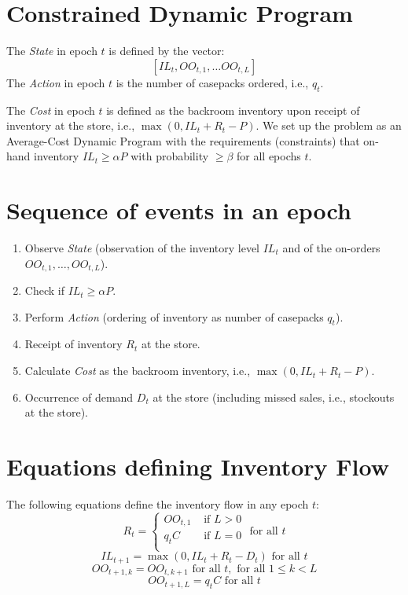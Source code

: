 \documentclass[12pt]{amsart}
\begin{document}
\section{Constrained Dynamic Program}
The {\em State} in epoch $t$ is defined by the vector:
 $$[IL_t, OO_{t,1}, \ldots OO_{t,L}]$$
 The {\em Action} in epoch $t$ is the number of casepacks ordered, i.e., $q_t$.
 
The {\em Cost} in epoch $t$ is defined as the backroom inventory upon receipt of inventory at the store, i.e., $\max(0, IL_t + R_t - P)$. We set up the problem as an Average-Cost Dynamic Program with the requirements (constraints) that on-hand inventory $IL_t \geq \alpha P$ with probability $\geq \beta$ for all epochs $t$.


\section{Sequence of events in an epoch}

\begin{enumerate}
\item Observe {\em State} (observation of the inventory level $IL_t$  and of the on-orders $OO_{t,1}, \ldots, OO_{t,L}$).
\item Check if $IL_t \geq \alpha P$.
\item Perform {\em Action} (ordering of inventory as number of casepacks $q_t$).
\item Receipt of inventory $R_t$ at the store.
\item Calculate {\em Cost} as the backroom inventory, i.e., $\max(0, IL_t + R_t - P)$.
\item Occurrence of demand $D_t$ at the store (including missed sales, i.e., stockouts at the store).
\end{enumerate}

\section{Equations defining Inventory Flow}
The following equations define the inventory flow in any epoch $t$:
$$R_t =
\begin{cases}
OO_{t,1} & \text{ if } L > 0\\
q_t C & \text{ if } L = 0\\
\end{cases}
\mbox{ for all } t$$
$$IL_{t+1} = \max(0, IL_{t} + R_t - D_t) \mbox{ for all } t$$
$$OO_{t+1,k} = OO_{t,k+1} \mbox{ for all } t, \mbox{ for all } 1 \leq k < L$$
$$OO_{t+1,L} = q_t C  \mbox{ for all } t$$
\end{document}
